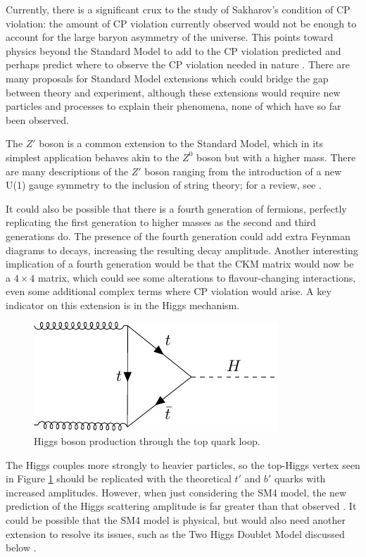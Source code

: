 \documentclass[a4paper,12pt]{article}
\begin{document}
Currently, there is a significant crux to the study of Sakharov's condition of CP violation: the amount of CP violation currently observed would not be enough to account for the large baryon asymmetry of the universe. 
This points toward physics beyond the Standard Model to add to the CP violation predicted and perhaps predict where to observe the CP violation needed in nature \cite{dono}. 
There are many proposals for Standard Model extensions which could bridge the gap between theory and experiment, although these extensions would require new particles and processes to explain their phenomena, none of which have so far been observed. 

The $Z'$ boson is a common extension to the Standard Model, which in its simplest application behaves akin to the $Z^0$ boson but with a higher mass. 
There are many descriptions of the $Z'$ boson ranging from the introduction of a new U(1) gauge symmetry to the inclusion of string theory; for a review, see \cite{zp}. 

It could also be possible that there is a fourth generation of fermions, perfectly replicating the first generation to higher masses as the second and third generations do. 
The presence of the fourth generation could add extra Feynman diagrams to decays, increasing the resulting decay amplitude. 
Another interesting implication of a fourth generation would be that the CKM matrix would now be a $4\times4$ matrix, which could see some alterations to flavour-changing interactions, even some additional complex terms where CP violation would arise. 
A key indicator on this extension is in the Higgs mechanism. 
\begin{figure}[H]
    \centering
    \includegraphics{../notes/higgs.pdf}
    \caption{\label{fig:higgs} Higgs boson production through the top quark loop.}
\end{figure}
The Higgs couples more strongly to heavier particles, so the top-Higgs vertex seen in Figure \ref{fig:higgs} should be replicated with the theoretical $t'$ and $b'$ quarks with increased amplitudes. 
However, when just considering the SM4 model, the new prediction of the Higgs scattering amplitude is far greater than that observed \cite{sm4}. 
It could be possible that the SM4 model is physical, but would also need another extension to resolve its issues, such as the Two Higgs Doublet Model discussed below \cite{shal}. 
\end{document}
